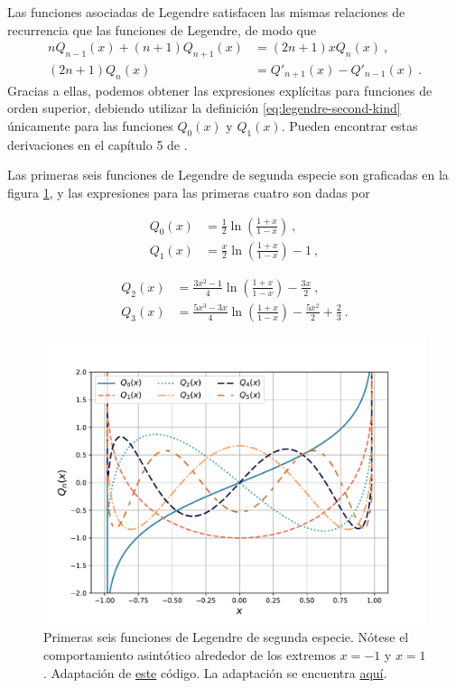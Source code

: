 Las funciones asociadas de Legendre satisfacen las mismas relaciones de recurrencia que las funciones de Legendre, de modo que
\begin{align}
    nQ_{n-1}(x) + (n+1)Q_{n+1}(x) & = (2n+1) x Q_n(x) \ , \\
    (2n+1)Q_n(x) & = Q'_{n+1}(x) - Q'_{n-1}(x) \ . 
\end{align}
Gracias a ellas, podemos obtener las expresiones explícitas para funciones de orden superior, debiendo utilizar la definición \eqref{eq:legendre-second-kind} únicamente para las funciones $Q_0(x)$ y $Q_1(x)$. Pueden encontrar estas derivaciones en el capítulo 5 de \cite{Rubilar}.

Las primeras seis funciones de Legendre de segunda especie son graficadas en la figura \ref{fig:Legendre-second-kind}, y las expresiones para las primeras cuatro son dadas por

\begin{minipage}[b]{.45\textwidth}
    \begin{align*}
        Q_0(x) & = \frac{1}{2} \ln\left( \frac{1+x}{1-x} \right) \ , \\
        Q_1(x) & = \frac{x}{2} \ln\left( \frac{1+x}{1-x} \right) - 1 \ ,
    \end{align*}
\end{minipage}
\hfill
\begin{minipage}[b]{.5\textwidth}
    \begin{align*}
        Q_2(x) & = \frac{3x^2-1}{4}\ln\left( \frac{1+x}{1-x} \right) - \frac{3x}{2} \ , \\
        Q_3(x) & = \frac{5x^3 - 3x}{4}\ln\left( \frac{1+x}{1-x} \right) - \frac{5x^2}{2} + \frac{2}{3} \ . 
    \end{align*}
\end{minipage}

\begin{figure}[htbp]
    \centering
    \includegraphics[width=12cm]{Figuras/Legendre-second-kind.pdf}
    \caption{Primeras seis funciones de Legendre de segunda especie. Nótese el comportamiento asintótico alrededor de los extremos $x = -1$ y $x=1$. Adaptación de \href{https://github.com/gfrubi/FM2/blob/master/figuras-editables/fig-Legendre.py}{este} código. La adaptación se encuentra \href{aa}{aquí}.}
    \label{fig:Legendre-second-kind}
\end{figure}

